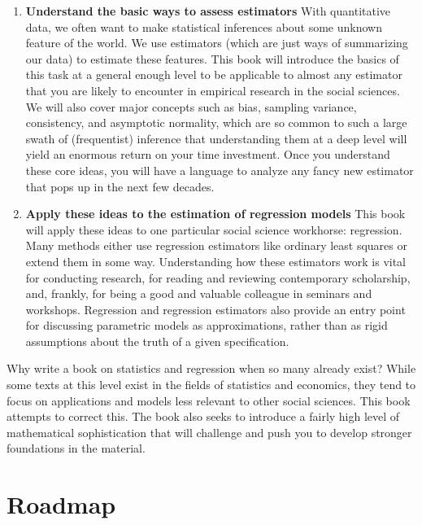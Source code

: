 \documentclass[
  13pt,
  letterpaper,
  DIV=11,
  numbers=noendperiod]{scrreprt}
\theoremstyle{plain}
\theoremstyle{plain}
\theoremstyle{definition}
\theoremstyle{definition}
\theoremstyle{remark}
\begin{document}
\begin{enumerate}
\def\labelenumi{\arabic{enumi}.}
\item
  \textbf{Understand the basic ways to assess estimators} With
  quantitative data, we often want to make statistical inferences about
  some unknown feature of the world. We use estimators (which are just
  ways of summarizing our data) to estimate these features. This book
  will introduce the basics of this task at a general enough level to be
  applicable to almost any estimator that you are likely to encounter in
  empirical research in the social sciences. We will also cover major
  concepts such as bias, sampling variance, consistency, and asymptotic
  normality, which are so common to such a large swath of (frequentist)
  inference that understanding them at a deep level will yield an
  enormous return on your time investment. Once you understand these
  core ideas, you will have a language to analyze any fancy new
  estimator that pops up in the next few decades.
\item
  \textbf{Apply these ideas to the estimation of regression models} This
  book will apply these ideas to one particular social science
  workhorse: regression. Many methods either use regression estimators
  like ordinary least squares or extend them in some way. Understanding
  how these estimators work is vital for conducting research, for
  reading and reviewing contemporary scholarship, and, frankly, for
  being a good and valuable colleague in seminars and workshops.
  Regression and regression estimators also provide an entry point for
  discussing parametric models as approximations, rather than as rigid
  assumptions about the truth of a given specification.
\end{enumerate}

Why write a book on statistics and regression when so many already
exist? While some texts at this level exist in the fields of statistics
and economics, they tend to focus on applications and models less
relevant to other social sciences. This book attempts to correct this.
The book also seeks to introduce a fairly high level of mathematical
sophistication that will challenge and push you to develop stronger
foundations in the material.

\section*{Roadmap}\label{roadmap}

\end{document}
